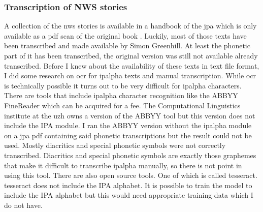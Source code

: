 \subsubsection*{Transcription of NWS stories}
A collection of the \ac{nws} stories is available in a handbook of the \ac{jpa} which is only available as a pdf scan of the original book . Luckily, most of those texts have been transcribed and made available by Simon Greenhill. At least the phonetic part of it has been transcribed, the original version was still not available already transcribed. Before I knew about the availability of these texts in text file format, I did some research on \ac{ocr} for \ac{ipalpha} texts and manual transcription. While \ac{ocr} is technically possible it turns out to be very difficult for \ac{ipalpha} characters. There are tools that include \ac{ipalpha} character recognition like the ABBYY FineReader which can be acquired for a fee. The Computational Linguistics institute at the \ac{uzh} owns a version of the ABBYY tool but this version does not include the IPA module. I ran the ABBYY version without the \ac{ipalpha} module on a \ac{jpa} pdf containing said phonetic transcriptions but the result could not be used. Mostly diacritics and special phonetic symbols were not correctly transcribed. Diacritics and special phonetic symbols are exactly those graphemes that make it difficult to transcribe \ac{ipalpha} manually, so there is not point in using this tool. There are also open source tools. One of which is called tesseract. tesseract does not include the IPA alphabet. It is possible to train the model to include the IPA alphabet but this would need appropriate training data which I do not have.

